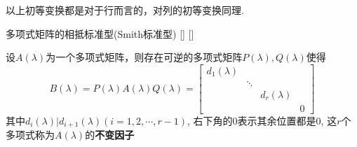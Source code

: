 \documentclass[UTF8]{ctexart}
\begin{document}
        以上初等变换都是对于行而言的，对列的初等变换同理.

        \begin{thm}
			[]
			{多项式矩阵的相抵标准型(Smith标准型)}
			[]
			[]
        
        	设$A(\lambda)$为一个多项式矩阵，则存在可逆的多项式矩阵$P(\lambda),Q(\lambda)$使得
            \[B\left(\lambda\right)=P\left(\lambda\right)A\left(\lambda\right)Q\left(\lambda\right)=\begin{bmatrix}d_{1}\left(\lambda\right)\\&\ddots\\&&d_{r}\left(\lambda\right)\\&&&0\end{bmatrix}\]
            其中$d_{i}(\lambda)|d_{i+1}(\lambda)(i=1,2,\cdots,r-1)$, 右下角的0表示其余位置都是0, 这$r$个多项式称为$A(\lambda)$的\textbf{不变因子}
        \end{thm}
\end{document}
